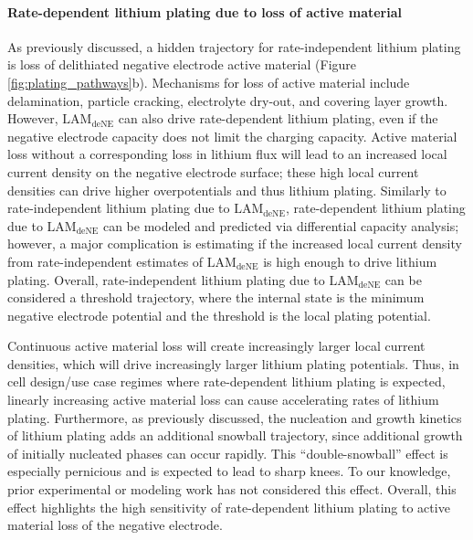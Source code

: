 \documentclass[journal=jpclcd,manuscript=article]{achemso}
\begin{document}
\paragraph{Rate-dependent lithium plating due to loss of active material}
As previously discussed, a hidden trajectory for rate-independent lithium plating is loss of delithiated negative electrode active material (Figure \ref{fig:plating_pathways}b).\cite{ansean_operando_2017, dubarry_durability_2018, baure_synthetic_2019, dubarry_big_2020} Mechanisms for loss of active material include delamination, particle cracking, electrolyte dry-out, and covering layer growth. However, $\mathrm{LAM_{deNE}}$ can also drive rate-dependent lithium plating, even if the negative electrode capacity does not limit the charging capacity. Active material loss without a corresponding loss in lithium flux will lead to an increased local current density on the negative electrode surface; these high local current densities can drive higher overpotentials and thus lithium plating.
Similarly to rate-independent lithium plating due to $\mathrm{LAM_{deNE}}$, rate-dependent lithium plating due to $\mathrm{LAM_{deNE}}$ can be modeled and predicted via differential capacity analysis;
however, a major complication is estimating if the increased local current density from rate-independent estimates of $\mathrm{LAM_{deNE}}$ is high enough to drive lithium plating.
Overall, rate-independent lithium plating due to $\mathrm{LAM_{deNE}}$ can be considered a threshold trajectory, where the internal state is the minimum negative electrode potential and the threshold is the local plating potential.

Continuous active material loss will create increasingly larger local current densities, which will drive increasingly larger lithium plating potentials. Thus, in cell design/use case regimes where rate-dependent lithium plating is expected, linearly increasing active material loss can cause accelerating rates of lithium plating.
Furthermore, as previously discussed, the nucleation and growth kinetics of lithium plating adds an additional snowball trajectory, since additional growth of initially nucleated phases can occur rapidly. This ``double-snowball'' effect is especially pernicious and is expected to lead to sharp knees. To our knowledge, prior experimental or modeling work has not considered this effect. Overall, this effect highlights the high sensitivity of rate-dependent lithium plating to active material loss of the negative electrode.
\end{document}
